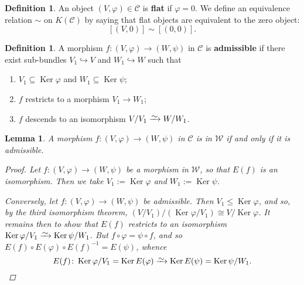 \documentclass[11pt,fleqn]{article}
\theoremstyle{plain}
\newtheorem{lemma}[theorem]{Lemma}
\theoremstyle{definition}
\newtheorem{definition}[theorem]{Definition}
\theoremstyle{remark}
\numberwithin{equation}{theorem}
\newcommand{\congto}{\xrightarrow{\raisebox{-.5ex}[0ex][0ex]{$\sim$}}}
\newcommand{\define}[1]{\textbf{#1}}
\DeclareMathOperator{\Ker}{Ker}
\begin{document}
        \begin{definition}
            An object $(V,\varphi)\in\mathcal{C}$ is \define{flat} if $\varphi=0$.
            We define an equivalence relation $\sim$ on $K(\mathcal{C})$ by saying that flat objects are equivalent to the zero object:
            \[
                [(V,0)]\sim[(0,0)].
            \]
        \end{definition}

        \begin{definition}\label{definition:admissible-morphism-in-C}
            A morphism $f\colon(V,\varphi)\to(W,\psi)$ in $\mathcal{C}$ is \define{admissible} if there exist sub-bundles $V_1\hookrightarrow V$ and $W_1\hookrightarrow W$ such that
            \begin{enumerate}
                \item $V_1\subseteq\Ker\varphi$ and $W_1\subseteq\Ker\psi$;
                \item $f$ restricts to a morphism $V_1\to W_1$;
                \item $f$ descends to an isomorphism $V/V_1\congto W/W_1$.
            \end{enumerate}
        \end{definition}

        \begin{lemma}\label{lemma:admissible-example-definition}
            A morphism $f\colon(V,\varphi)\to(W,\psi)$ in $\mathcal{C}$ is in $\mathcal{W}$ if and only if it is admissible.
            \begin{proof}
                Let $f\colon(V,\varphi)\to(W,\psi)$ be a morphism in $\mathcal{W}$, so that $E(f)$ is an isomorphism.
                Then we take $V_1:=\Ker\varphi$ and $W_1:=\Ker\psi$.

                Conversely, let $f\colon(V,\varphi)\to(W,\psi)$ be admissible.
                Then $V_1\leqslant\Ker\varphi$, and so, by the third isomorphism theorem, $(V/V_1)/(\Ker\varphi/V_1)\cong V/\Ker\varphi$.
                It remains then to show that $E(f)$ restricts to an isomorphism $\Ker\varphi/V_1\congto\Ker\psi/W_1$.
                But $f\circ\varphi=\psi\circ f$, and so $E(f)\circ E(\varphi)\circ E(f)^{-1}=E(\psi)$, whence
                \[
                    E(f)\colon\Ker\varphi/V_1=\Ker E(\varphi)\congto\Ker E(\psi)=\Ker\psi/W_1.\qedhere
                \]
            \end{proof}
        \end{lemma}
\end{document}

